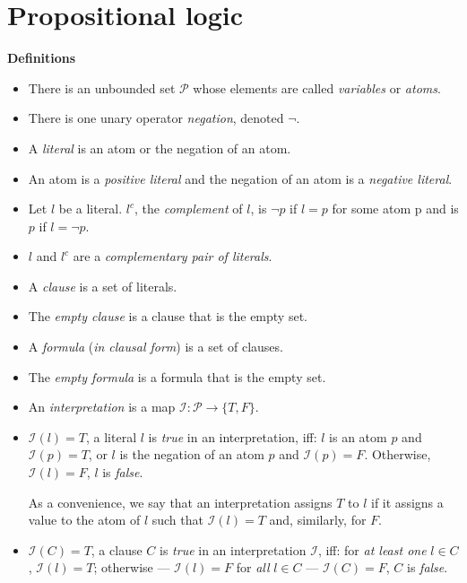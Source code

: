 \documentclass[11pt]{report}
\newcommand*{\ngg}{\mathop{\neg}}
\begin{document}
\tableofcontents

\chapter{Propositional logic}\label{ch.intro}

\begin{center}
\textbf{Definitions}
\end{center}

\begin{itemize}
\item There is an unbounded set $\mathcal{P}$ whose elements are called
\emph{variables} or \emph{atoms}.
\item There is one unary operator \emph{negation}, denoted $\ngg$.
\item A \emph{literal} is an atom or the negation of an atom.
\item An atom is a \emph{positive literal} and the negation of an atom
is a \emph{negative literal}.
\item Let $l$ be a literal. $l^c$, the \emph{complement} of $l$, is $\ngg p$ if
$l=p$ for some atom p and is $p$ if $l=\ngg p$.
\item $l$ and $l^c$ are a \emph{complementary pair of literals}.
\item A \emph{clause} is a set of literals.
\item The \emph{empty clause} is a clause that is the empty set.
\item A \emph{formula} (\emph{in clausal form}) is a set of clauses.
\item The \emph{empty formula} is a formula that is the empty set.

\item An \emph{interpretation} is a map $\mathcal{I}: \mathcal{P}
\rightarrow \{T,F\}$.

\item $\mathcal{I}(l)=T$, a literal $l$ is \emph{true} in an
interpretation, iff: $l$ is an atom $p$ and $\mathcal{I}(p)=T$, or $l$
is the negation of an atom $p$ and $\mathcal{I}(p)=F$. Otherwise,
$\mathcal{I}(l)=F$, $l$ is \emph{false}.

As a convenience, we say that an interpretation assigns $T$ to $l$ if it
assigns a value to the atom of $l$ such that $\mathcal{I}(l)=T$ and,
similarly, for $F$.

\item $\mathcal{I}(C)=T$, a clause $C$ is \emph{true} in an
interpretation $\mathcal{I}$, iff: for \emph{at least one} $l\in C$,
$\mathcal{I}(l)=T$; otherwise --- $\mathcal{I}(l)=F$ for \emph{all}
$l\in C$ --- $\mathcal{I}(C)=F$, $C$ is \emph{false}.


\end{itemize}
\end{document}
